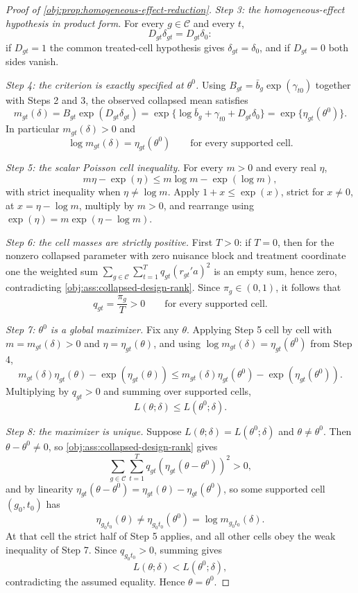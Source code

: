 \begin{proof}[Proof of \cref{obj:prop:homogeneous-effect-reduction}]
\textit{Step 3: the homogeneous-effect hypothesis in product form.} For every \(g\in\mathcal C\) and every \(t\),
\[
D_{gt}\delta_{gt}=D_{gt}\delta_0 :
\]
if \(D_{gt}=1\) the common treated-cell hypothesis gives \(\delta_{gt}=\delta_0\), and if \(D_{gt}=0\) both sides vanish.

\textit{Step 4: the criterion is exactly specified at \(\theta^0\).} Using \(B_{gt}=\bar b_g\exp(\gamma_{t0})\) together with Steps 2 and 3, the observed collapsed mean satisfies
\[
m_{gt}(\delta)
=
B_{gt}\exp(D_{gt}\delta_{gt})
=
\exp\{\log\bar b_g+\gamma_{t0}+D_{gt}\delta_0\}
=
\exp\{\eta_{gt}(\theta^0)\}.
\]
In particular \(m_{gt}(\delta)>0\) and
\[
\log m_{gt}(\delta)=\eta_{gt}(\theta^0)
\qquad\text{for every supported cell.}
\]

\textit{Step 5: the scalar Poisson cell inequality.} For every \(m>0\) and every real \(\eta\),
\[
m\eta-\exp(\eta)\le m\log m-\exp(\log m),
\]
with strict inequality when \(\eta\neq\log m\). Apply \(1+x\le\exp(x)\), strict for \(x\neq0\), at \(x=\eta-\log m\), multiply by \(m>0\), and rearrange using \(\exp(\eta)=m\exp(\eta-\log m)\).

\textit{Step 6: the cell masses are strictly positive.} First \(T>0\): if \(T=0\), then for the nonzero collapsed parameter with zero nuisance block and treatment coordinate one the weighted sum \(\sum_{g\in\mathcal C}\sum_{t=1}^T q_{gt}(r_{gt}'a)^2\) is an empty sum, hence zero, contradicting \cref{obj:ass:collapsed-design-rank}. Since \(\pi_g\in(0,1)\), it follows that
\[
q_{gt}=\frac{\pi_g}{T}>0
\qquad\text{for every supported cell.}
\]

\textit{Step 7: \(\theta^0\) is a global maximizer.} Fix any \(\theta\). Applying Step 5 cell by cell with \(m=m_{gt}(\delta)>0\) and \(\eta=\eta_{gt}(\theta)\), and using \(\log m_{gt}(\delta)=\eta_{gt}(\theta^0)\) from Step 4,
\[
m_{gt}(\delta)\eta_{gt}(\theta)-\exp\!\left(\eta_{gt}(\theta)\right)
\le
m_{gt}(\delta)\eta_{gt}(\theta^0)-\exp\!\left(\eta_{gt}(\theta^0)\right).
\]
Multiplying by \(q_{gt}>0\) and summing over supported cells,
\[
L(\theta;\delta)\le L(\theta^0;\delta).
\]

\textit{Step 8: the maximizer is unique.} Suppose \(L(\theta;\delta)=L(\theta^0;\delta)\) and \(\theta\neq\theta^0\). Then \(\theta-\theta^0\neq0\), so \cref{obj:ass:collapsed-design-rank} gives
\[
\sum_{g\in\mathcal C}\sum_{t=1}^T q_{gt}\left(\eta_{gt}(\theta-\theta^0)\right)^2>0 ,
\]
and by linearity \(\eta_{gt}(\theta-\theta^0)=\eta_{gt}(\theta)-\eta_{gt}(\theta^0)\), so some supported cell \((g_0,t_0)\) has
\[
\eta_{g_0t_0}(\theta)\neq\eta_{g_0t_0}(\theta^0)=\log m_{g_0t_0}(\delta).
\]
At that cell the strict half of Step 5 applies, and all other cells obey the weak inequality of Step 7. Since \(q_{g_0t_0}>0\), summing gives
\[
L(\theta;\delta)<L(\theta^0;\delta),
\]
contradicting the assumed equality. Hence \(\theta=\theta^0\).


\end{proof}
